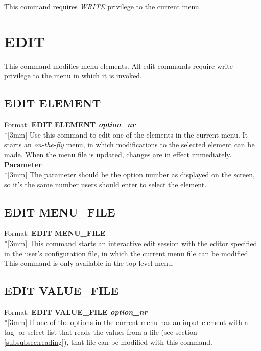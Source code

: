 \documentclass[a4paper]{book}
\renewcommand{\indent}{\hspace*{5mm}}
\begin{document}
This command requires \textsl{WRITE} privilege to the current menu.

\section{EDIT}
\label{subsec:mylabel13}

This command modifies menu elements. All edit commands require write 
privilege to the menu in which it is invoked.

\subsection{EDIT ELEMENT}
\label{subsubsec:mylabel67}

\indent Format: \textbf{EDIT ELEMENT \textit{option{\_}nr}}\dag\\*[3mm]
Use this command to edit one of the elements in the current menu. It starts 
an \textit{on-the-fly} menu, in which modifications to the selected element can be made. When 
the menu file is updated, changes are in effect immediately.\\[3mm]
\textbf{Parameter}\\*[3mm]
The parameter should be the option number as displayed on the screen, so 
it's the same number users should enter to select the element.

\subsection{EDIT MENU{\_}FILE}
\label{subsubsec:mylabel68}

\indent Format: \textbf{EDIT MENU{\_}FILE}\dag\\*[3mm]
This command starts an interactive edit session with the editor
specified in  the user's configuration file, in which the current menu 
file can be modified. This command is only 
available in the top-level menu.

\subsection{EDIT VALUE{\_}FILE}
\label{subsubsec:mylabel69}

\indent Format: \textbf{EDIT VALUE{\_}FILE \textit{option{\_}nr}}\\*[3mm]
If one of the options in the current menu has an input element with a tag- 
or select list that reads the values from a file (see section 
\ref{subsubsec:reading}), that file can be modified with this command.
\end{document}

